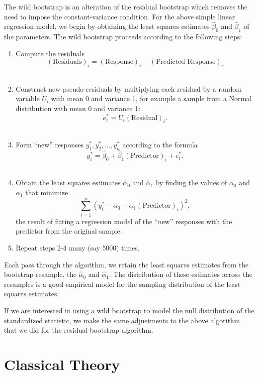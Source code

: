\documentclass[
  letterpaper,
  DIV=11,
  numbers=noendperiod]{scrreprt}
\providecommand{\tightlist}{%
  \setlength{\itemsep}{0pt}\setlength{\parskip}{0pt}}\usepackage{longtable,booktabs,array}
\theoremstyle{definition}
\theoremstyle{definition}
\theoremstyle{plain}
\theoremstyle{remark}
\begin{document}
The wild bootstrap is an alteration of the residual bootstrap which
removes the need to impose the constant-variance condition. For the
above simple linear regression model, we begin by obtaining the least
squares estimates \(\widehat{\beta}_0\) and \(\widehat{\beta}_1\) of the
parameters. The wild bootstrap proceeds according to the following
steps:

\begin{enumerate}
\def\labelenumi{\arabic{enumi}.}
\tightlist
\item
  Compute the residuals
  \[(\text{Residuals})_i = (\text{Response})_i - (\text{Predicted Response})_i\]\\
\item
  Construct new pseudo-residuals by multiplying each residual by a
  random variable \(U_i\) with mean 0 and variance 1, for example a
  sample from a Normal distribution with mean 0 and variance 1:
  \[e_i^* = U_i (\text{Residual})_i.\]\\
\item
  Form ``new'' responses \(y_1^*, y_2^*, \dotsc, y_n^*\) according to
  the formula
  \[y_i^* = \widehat{\beta}_0 + \widehat{\beta}_1 (\text{Predictor})_i + e_i^*.\]\\
\item
  Obtain the least squares estimates \(\widehat{\alpha}_0\) and
  \(\widehat{\alpha}_1\) by finding the values of \(\alpha_0\) and
  \(\alpha_1\) that minimize
  \[\sum_{i=1}^{n} \left(y_i^* - \alpha_0 - \alpha_1 (\text{Predictor})_i\right)^2,\]
  the result of fitting a regression model of the ``new'' responses with
  the predictor from the original sample.\\
\item
  Repeat steps 2-4 many (say 5000) times.
\end{enumerate}

Each pass through the algorithm, we retain the least squares estimates
from the bootstrap resample, the \(\widehat{\alpha}_0\) and
\(\widehat{\alpha}_1\). The distribution of these estimates across the
resamples is a good empirical model for the sampling distribution of the
least squares estimates.

If we are interested in using a wild bootstrap to model the null
distribution of the standardized statistic, we make the same adjustments
to the above algorithm that we did for the residual bootstrap algorithm.

\hypertarget{classical-theory}{%
\section{Classical Theory}\label{classical-theory}}
\end{document}
